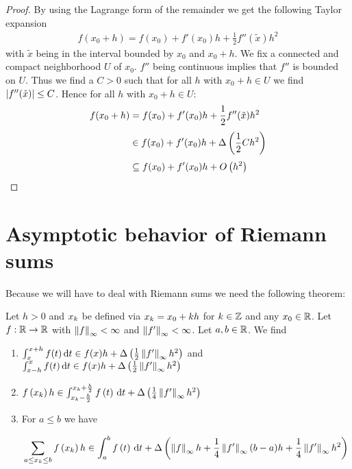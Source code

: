 \begin{proof}
  By using the Lagrange form of the remainder we get the following Taylor expansion \cite[p. 284]{koenigsberger}
  \begin{align}
    f(x_0+h)=f(x_0)+f'(x_0)h + \frac 12 f''(\tilde x) h^2
  \end{align}
  with $\tilde x$ being in the interval bounded by $x_0$ and $x_0+h$. We fix a connected and compact neighborhood $U$ of $x_0$. $f''$ being continuous implies that $f''$ is bounded on $U$. Thus we find a $C > 0$ such that for all $h$ with $x_0+h\in U$ we find $\abs{f''(\tilde x)} \le C$. Hence for all $h$ with $x_0+h\in U$:
  \begin{align}
    f(x_0+h)& =f(x_0)+f'(x_0)h + \frac 12 f''(\tilde x) h^2 \nl
    & \in f(x_0)+f'(x_0)h + \bigabs{\frac 12 C h^2} \nl
    & \subseteq f(x_0)+f'(x_0)h + \bigo{h^2}
  \end{align}
\end{proof}

\section{Asymptotic behavior of Riemann sums}

Because we will have to deal with Riemann sums we need the following theorem:

\begin{theorem} \label{thm:asymptotics_riemann}
  Let $h > 0$ and $\x[k]$ be defined via $\x[k] = \x[0] + kh$ for $k\in\Z$ and any $\x[0]\in\R$. Let $f:\R\to\R$ with $\snorm{f} < \infty$ and $\snorm{f'} < \infty$. Let $a,b\in\R$. We find

  \begin{enumerate}
    \item $\int_x^{x+h} f(t) \d{t} \in f(x)h + \bigabs{\frac 12 \snorm{f'} h^2}$ and $\int_{x-h}^x f(t) \d{t} \in f(x) h + \bigabs{\frac 12 \snorm{f'} h^2}$
    \item $\f{\x} h \in \int_{\x-\frac h2}^{\x + \frac h2} \f{t}\d{t} + \bigabs{\frac 14 \snorm{f'} h^2}$
    \item For $a \le b$ we have

      \begin{align}
        \sum_{a \le \x \le b} \f{\x} h \in \int_a^b \f{t}\d{t} + \bigabs{\snorm{f} h + \frac 14 \snorm{f'}(b-a)h + \frac 14 \snorm{f'}h^2}
      \end{align}
  \end{enumerate}
\end{theorem}

